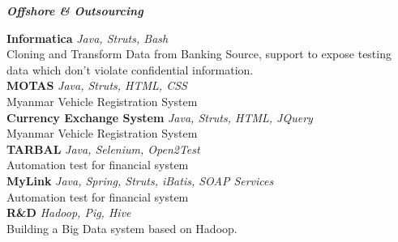 \documentclass[a4paper]{article}
\begin{document}
\begin{center}
	\textbf{\textit{Offshore \& Outsourcing}}
\end{center}

{\textbf{Informatica}} {\sl Java, Struts, Bash}\\
Cloning and Transform Data from Banking Source, support to expose testing data which don't violate confidential information.\\
\vspace*{2mm}
{\textbf{MOTAS}} {\sl Java, Struts, HTML, CSS}\\
Myanmar Vehicle Registration System\\
\vspace*{2mm}
{\textbf{Currency Exchange System}} {\sl Java, Struts, HTML, JQuery}\\
Myanmar Vehicle Registration System\\
\vspace*{2mm}
{\textbf{TARBAL}} {\sl Java, Selenium, Open2Test}\\
Automation test for financial system\\
\vspace*{2mm}
{\textbf{MyLink}} {\sl Java, Spring, Struts, iBatis, SOAP Services}\\
Automation test for financial system\\
\vspace*{2mm}
{\textbf{R\&D}} {\sl Hadoop, Pig, Hive}\\
Building a Big Data system based on Hadoop.\\
\vspace*{2mm}

\ 
\end{document}
